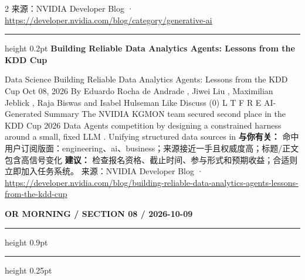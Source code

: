 \documentclass[10.5pt]{ctexart}
\begin{document}
\begin{multicols}{2}
{\footnotesize\color{ormuted} 来源：NVIDIA Developer Blog · \url{https://developer.nvidia.com/blog/category/generative-ai}}
\vspace{2mm}
\hrule height 0.2pt
\vspace{2mm}
{\large\bfseries Building Reliable Data Analytics Agents: Lessons from the KDD Cup}\par
Data Science Building Reliable Data Analytics Agents: Lessons from the KDD Cup Oct 08, 2026 By Eduardo Rocha de Andrade , Jiwei Liu , Maximilian Jeblick , Raja Biswas and Isabel Hulseman Like Discuss (0) L T F R E AI-Generated Summary The NVIDIA KGMON team secured second place in the KDD Cup 2026 Data Agents competition by designing a constrained harness around a small, fixed LLM . Unifying structured data sources in
\textbf{与你有关：} 命中用户订阅版面：engineering、ai、business；来源接近一手且权威度高；标题/正文包含高信号变化
\textbf{建议：} 检查报名资格、截止时间、参与形式和预期收益；合适则立即加入任务系统。
{\footnotesize\color{ormuted} 来源：NVIDIA Developer Blog · \url{https://developer.nvidia.com/blog/building-reliable-data-analytics-agents-lessons-from-the-kdd-cup}}
\end{multicols}
\newpage
{\small\bfseries OR MORNING / SECTION 08 / 2026-10-09}
\vspace{2mm}
\hrule height 0.9pt
\vspace{1.5mm}
\hrule height 0.25pt
\vspace{4mm}
\end{document}
